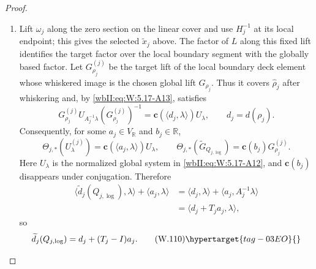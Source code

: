 \begin{proof}
\begin{enumerate}[label=\arabic*.,leftmargin=*]
\[\begin{aligned}
 p_{j,\log}\circ\widetilde\gamma_{j,\log}
  &=\gamma_j^N,\\
 \widetilde\gamma_{j,\log}(0)&=x_j,\\
 \widetilde\gamma_{j,\log}(1)&=q_{j,\log}(x_j).
\end{aligned}
\]
Let $\widetilde\gamma_{j,\mathrm{vec}}$ be the $r_j^*$-lift of
$\widetilde\gamma_{j,\log}$ beginning at the selected $\widetilde x_j$.
For the clockwise lift, $\alpha_1=\alpha_0-1/m_j$.  Writing
$\zeta_0=-\alpha_0\Pi(s_j)v_j$, period equivariance and $A_jv_j=v_j$ give
\[
 \zeta_1=-(\alpha_0-1/m_j)\Pi(g_js_j)v_j
 =R_{g_j}(s_j)\zeta_0+\Pi(g_js_j)v_j/m_j.
\]
By , this gives
\[
 \widetilde\gamma_{j,\mathrm{vec}}(1)
 =Q_{j,\log}(\widetilde x_j),
\]
for this selected vector lift.
Fibre loops remain \(\tau_\lambda\), since \(h_j\) is a fibre translation.

\item Lift $\omega_j$ along the zero section on the linear cover and use
$H_j^{-1}$ at its local endpoint; this gives the selected
$\widetilde x_j$ above.  The factor of $L$ along this fixed lift identifies the
target factor over the local boundary segment with the globally based
factor.  Let \(G_{\rho_j}^{(j)}\) be the target lift of the local boundary
deck element whose whiskered image is the chosen global lift
\(G_{\rho_j}\).  Thus it covers \(\widehat\rho_j\) after whiskering and,
by \eqref{wbII:eq:W:5.17-A13}, satisfies
\[
 G_{\rho_j}^{(j)}U_{A_j^{-1}\lambda}(G_{\rho_j}^{(j)})^{-1}
 =\mathbf c(\langle d_j,\lambda\rangle)U_\lambda,
 \qquad d_j=d(\rho_j).
\]
Consequently, for some
\(a_j\in V_{\mathbb R}\) and \(b_j\in\mathbb R\),
\[
 \Theta_{j,*}(U_\lambda^{(j)})
 =\mathbf c(\langle a_j,\lambda\rangle)U_\lambda,
 \qquad
 \Theta_{j,*}(\widetilde G_{Q_{j,\log}})
 =\mathbf c(b_j)G_{\rho_j}^{(j)}.
\]
Here \(U_\lambda\) is the normalized global system in \eqref{wbII:eq:W:5.17-A12}, and
\(\mathbf c(b_j)\) disappears under conjugation.
Therefore
\[
\begin{aligned}
 \langle\widetilde d_j(Q_{j,\log}),\lambda\rangle
 +\langle a_j,\lambda\rangle
 &=\langle d_j,\lambda\rangle
   +\langle a_j,A_j^{-1}\lambda\rangle\\
 &=\langle d_j+T_ja_j,\lambda\rangle,
\end{aligned}
\]
so
\[
 \widetilde d_j(Q_{j,\log})=d_j+(T_j-I)a_j.
\tag{W.110}\hypertarget{tag-03EO}{}\label{wbII:eq:W:5.17-A14e}
\]


\end{enumerate}
\end{proof}
